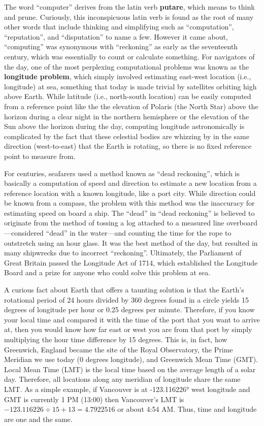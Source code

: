 \documentclass[
]{book}
\begin{document}
The word ``computer'' derives from the latin verb \textbf{putare}, which means to think and prune. Curiously, this inconspicuous latin verb is found as the root of many other words that include thinking and simplifying such as ``computation'', ``reputation'', and ``disputation'' to name a few. However it came about, ``computing'' was synonymous with ``reckoning'' as early as the seventeenth century, which was essentially to count or calculate something. For navigators of the day, one of the most perplexing computational problems was known as the \textbf{longitude problem}, which simply involved estimating east-west location (i.e., longitude) at sea, something that today is made trivial by satellites orbiting high above Earth. While latitude (i.e., north-south location) can be easily computed from a reference point like the the elevation of Polaris (the North Star) above the horizon during a clear night in the northern hemisphere or the elevation of the Sun above the horizon during the day, computing longitude astronomically is complicated by the fact that these celestial bodies are whizzing by in the same direction (west-to-east) that the Earth is rotating, so there is no fixed reference point to measure from.

For centuries, seafarers used a method known as ``dead reckoning'', which is basically a computation of speed and direction to estimate a new location from a reference location with a known longitude, like a port city. While direction could be known from a compass, the problem with this method was the inaccuracy for estimating speed on board a ship. The ``dead'' in ``dead reckoning'' is believed to originate from the method of tossing a log attached to a measured line overboard---considered ``dead'' in the water---and counting the time for the rope to outstretch using an hour glass. It was the best method of the day, but resulted in many shipwrecks due to incorrect ``reckoning''. Ultimately, the Parliament of Great Britain passed the Longitude Act of 1714, which established the Longitude Board and a prize for anyone who could solve this problem at sea.

A curious fact about Earth that offers a taunting solution is that the Earth's rotational period of 24 hours divided by 360 degrees found in a circle yields 15 degrees of longitude per hour or 0.25 degrees per minute. Therefore, if you know your local time and compared it with the time of the port that you want to arrive at, then you would know how far east or west you are from that port by simply multiplying the hour time difference by 15 degrees. This is, in fact, how Greenwich, England became the site of the Royal Observatory, the Prime Meridian we use today (0 degrees longitude), and Greenwich Mean Time (GMT). Local Mean Time (LMT) is the local time based on the average length of a solar day. Therefore, all locations along any meridian of longitude share the same LMT. As a simple example, if Vancouver is at -123.116226° west longitude and GMT is currently 1 PM (13:00) then Vancouver's LMT is \(-123.116226÷15+13=4.7922516\) or about 4:54 AM. Thus, time and longitude are one and the same.
\end{document}
